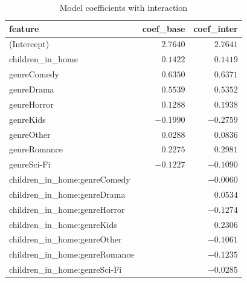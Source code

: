 \documentclass[
  letterpaper,
]{krantz}
\begin{document}
\begin{longtable}{lrr}

\caption{\label{tbl-model-interaction-output}Model coefficients with
interaction}

\tabularnewline

\toprule
feature & coef\_base & coef\_inter \\ 
\midrule\addlinespace[2.5pt]
(Intercept) & \textcolor[HTML]{404040}{$2.7640$} & \textcolor[HTML]{404040}{$2.7641$} \\ 
children\_in\_home & \textcolor[HTML]{404040}{$0.1422$} & \textcolor[HTML]{404040}{$0.1419$} \\ 
genreComedy & \textcolor[HTML]{404040}{$0.6350$} & \textcolor[HTML]{404040}{$0.6371$} \\ 
genreDrama & \textcolor[HTML]{404040}{$0.5539$} & \textcolor[HTML]{404040}{$0.5352$} \\ 
genreHorror & \textcolor[HTML]{404040}{$0.1288$} & \textcolor[HTML]{404040}{$0.1938$} \\ 
genreKids & \textcolor[HTML]{404040}{$-0.1990$} & \textcolor[HTML]{404040}{$-0.2759$} \\ 
genreOther & \textcolor[HTML]{404040}{$0.0288$} & \textcolor[HTML]{404040}{$0.0836$} \\ 
genreRomance & \textcolor[HTML]{404040}{$0.2275$} & \textcolor[HTML]{404040}{$0.2981$} \\ 
genreSci-Fi & \textcolor[HTML]{404040}{$-0.1227$} & \textcolor[HTML]{404040}{$-0.1090$} \\ 
children\_in\_home:genreComedy & \textcolor[HTML]{404040}{} & \textcolor[HTML]{404040}{$-0.0060$} \\ 
children\_in\_home:genreDrama & \textcolor[HTML]{404040}{} & \textcolor[HTML]{404040}{$0.0534$} \\ 
children\_in\_home:genreHorror & \textcolor[HTML]{404040}{} & \textcolor[HTML]{404040}{$-0.1274$} \\ 
children\_in\_home:genreKids & \textcolor[HTML]{404040}{} & \textcolor[HTML]{404040}{$0.2306$} \\ 
children\_in\_home:genreOther & \textcolor[HTML]{404040}{} & \textcolor[HTML]{404040}{$-0.1061$} \\ 
children\_in\_home:genreRomance & \textcolor[HTML]{404040}{} & \textcolor[HTML]{404040}{$-0.1235$} \\ 
children\_in\_home:genreSci-Fi & \textcolor[HTML]{404040}{} & \textcolor[HTML]{404040}{$-0.0285$} \\ 
\bottomrule

\end{longtable}
\end{document}

